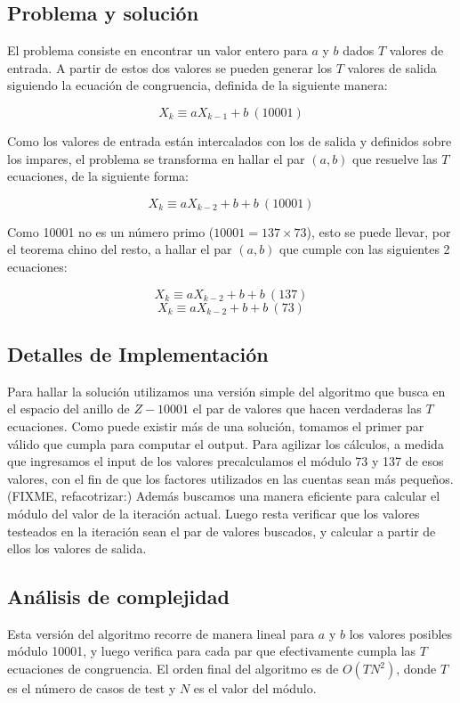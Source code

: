 \subsection*{Problema y solución}

El problema consiste en encontrar un valor entero para $a$ y $b$ dados $T$
valores de entrada. A partir de estos dos valores se pueden generar los $T$
valores de salida siguiendo la ecuación de congruencia, definida de la
siguiente manera:

$$X_k \equiv aX_{k-1} + b\ (10001)$$

Como los valores de entrada están intercalados con los de salida y definidos
sobre los impares, el problema se transforma en hallar el par $(a,b)$ que
resuelve las $T$ ecuaciones, de la siguiente forma:

$$X_k \equiv aX_{k-2} + b + b\ (10001)$$

Como 10001 no es un número primo ($10001 = 137\times 73$), esto se puede
llevar, por el teorema chino del resto, a hallar el par $(a,b)$ que cumple con
las siguientes 2 ecuaciones:

$$X_k \equiv aX_{k-2} + b + b\ (137)$$
$$X_k \equiv aX_{k-2} + b + b\ (73)$$


\subsection*{Detalles de Implementación}

Para hallar la solución utilizamos una versión simple del algoritmo que busca
en el espacio del anillo de $Z-10001$ el par de valores que hacen verdaderas
las $T$ ecuaciones. Como puede existir más de una solución, tomamos el primer
par válido que cumpla para computar el output. Para agilizar los cálculos, a
medida que ingresamos el input de los valores precalculamos el módulo 73 y 137
de esos valores, con el fin de que los factores utilizados en las cuentas sean
más pequeños. (FIXME, refacotrizar:) Además buscamos una manera eficiente para
calcular el módulo del valor de la iteración actual. Luego resta verificar que
los valores testeados en la iteración sean el par de valores buscados, y
calcular a partir de ellos los valores de salida.


\subsection*{Análisis de complejidad}

Esta versión del algoritmo recorre de manera lineal para $a$ y $b$ los valores
posibles módulo 10001, y luego verifica para cada par que efectivamente cumpla
las $T$ ecuaciones de congruencia. El orden final del algoritmo es de
$O(TN^2)$, donde $T$ es el número de casos de test y $N$ es el valor del módulo.
